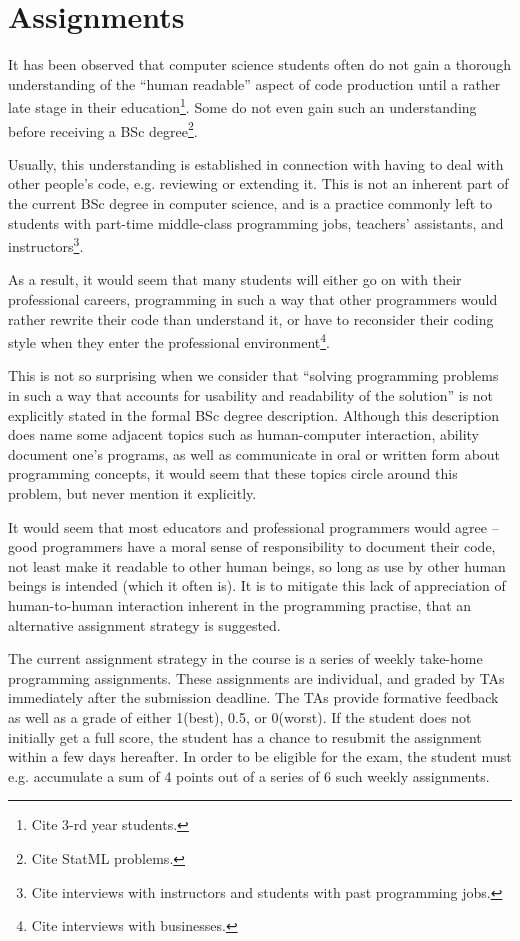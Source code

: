 \section{Assignments}

It has been observed that computer science students often do not gain a
thorough understanding of the ``human readable'' aspect of code production
until a rather late stage in their education\footnote{Cite 3-rd year
students.}. Some do not even gain such an understanding before receiving a BSc
degree\footnote{Cite StatML problems.}.

Usually, this understanding is established in connection with having to deal
with other people's code, e.g. reviewing or extending it. This is not an
inherent part of the current BSc degree in computer science, and is a practice
commonly left to students with part-time middle-class programming jobs,
teachers' assistants, and instructors\footnote{Cite interviews with
instructors and students with past programming jobs.}.

As a result, it would seem that many students will either go on with their
professional careers, programming in such a way that other programmers would
rather rewrite their code than understand it, or have to reconsider their
coding style when they enter the professional environment\footnote{Cite
interviews with businesses.}.

This is not so surprising when we consider that ``solving programming problems
in such a way that accounts for usability and readability of the solution'' is
not explicitly stated in the formal BSc degree
description\cite{studieordning-2009}. Although this description does name some
adjacent topics such as human-computer interaction, ability document one's
programs, as well as communicate in oral or written form about programming
concepts, it would seem that these topics circle around this problem, but never
mention it explicitly.

It would seem that most educators and professional programmers would agree --
good programmers have a moral sense of responsibility to document their code,
not least make it readable to other human beings, so long as use by other human
beings is intended (which it often is). It is to mitigate this lack of
appreciation of human-to-human interaction inherent in the programming
practise, that an alternative assignment strategy is suggested.

The current assignment strategy in the course is a series of weekly take-home
programming assignments. These assignments are individual, and graded by TAs
immediately after the submission deadline. The TAs provide formative feedback
as well as a grade of either 1(best), 0.5, or 0(worst). If the student does not
initially get a full score, the student has a chance to resubmit the assignment
within a few days hereafter. In order to be eligible for the exam, the student
must e.g. accumulate a sum of 4 points out of a series of 6 such weekly
assignments.

